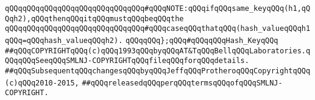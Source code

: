 \verb|qQQqqQQqqQQqqQQqqQQqqQQqqQQqqQQq#qQQqNOTE:qQQqifqQQqsame_keyqQQq(h1,qQQqh2),qQQqthenqQQqitqQQqmustqQQqbeqQQqthe|\newline
\verb|qQQqqQQqqQQqqQQqqQQqqQQqqQQqqQQq#qQQqcaseqQQqthatqQQq(hash_valueqQQqh1qQQq=qQQqhash_valueqQQqh2).|\newline
\newline
\newline
\verb|qQQqqQQq};qQQq#qQQqqQQqHash_KeyqQQq|\newline
\newline
\newline
\verb|##qQQqCOPYRIGHTqQQq(c)qQQq1993qQQqbyqQQqAT&TqQQqBellqQQqLaboratories.qQQqqQQqSeeqQQqSMLNJ-COPYRIGHTqQQqfileqQQqforqQQqdetails.|\newline
\verb|##qQQqSubsequentqQQqchangesqQQqbyqQQqJeffqQQqProtheroqQQqCopyrightqQQq(c)qQQq2010-2015,|\newline
\verb|##qQQqreleasedqQQqperqQQqtermsqQQqofqQQqSMLNJ-COPYRIGHT.|\newline

